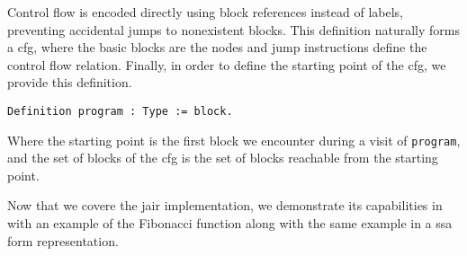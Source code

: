 Control flow is encoded directly using block references instead of labels, preventing accidental jumps to nonexistent blocks. This definition naturally forms a \gls{cfg}, where the basic blocks are the nodes and jump instructions define the control flow relation. Finally, in order to define the starting point of the \gls{cfg}, we provide this definition.

\begin{lstlisting}[style=Rocq]
Definition program : Type := block.
\end{lstlisting}

Where the starting point is the first block we encounter during a visit of \texttt{program}, and the set of blocks of the \gls{cfg} is the set of blocks reachable from the starting point.

Now that we covere the \gls{jair} implementation, we demonstrate its capabilities in  with an example of the Fibonacci function along with the same example in a \gls{ssa} form representation.

